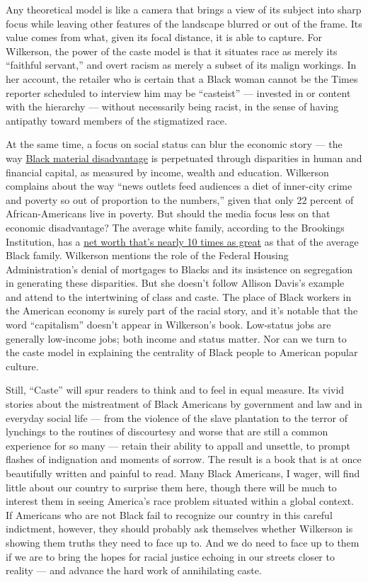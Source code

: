 Any theoretical model is like a camera that brings a view of its subject
into sharp focus while leaving other features of the landscape blurred
or out of the frame. Its value comes from what, given its focal
distance, it is able to capture. For Wilkerson, the power of the caste
model is that it situates race as merely its ``faithful servant,'' and
overt racism as merely a subset of its malign workings. In her account,
the retailer who is certain that a Black woman cannot be the Times
reporter scheduled to interview him may be ``casteist'' --- invested in
or content with the hierarchy --- without necessarily being racist, in
the sense of having antipathy toward members of the stigmatized race.

At the same time, a focus on social status can blur the economic story
--- the way
\href{https://www.nytimes3xbfgragh.onion/interactive/2019/08/14/magazine/racial-wealth-gap.html}{Black
material disadvantage} is perpetuated through disparities in human and
financial capital, as measured by income, wealth and education.
Wilkerson complains about the way ``news outlets feed audiences a diet
of inner-city crime and poverty so out of proportion to the numbers,''
given that only 22 percent of African-Americans live in poverty. But
should the media focus less on that economic disadvantage? The average
white family, according to the Brookings Institution, has a
\href{https://www.brookings.edu/blog/up-front/2020/02/27/examining-the-black-white-wealth-gap/}{net
worth that's nearly 10 times as great} as that of the average Black
family. Wilkerson mentions the role of the Federal Housing
Administration's denial of mortgages to Blacks and its insistence on
segregation in generating these disparities. But she doesn't follow
Allison Davis's example and attend to the intertwining of class and
caste. The place of Black workers in the American economy is surely part
of the racial story, and it's notable that the word ``capitalism''
doesn't appear in Wilkerson's book. Low-status jobs are generally
low-income jobs; both income and status matter. Nor can we turn to the
caste model in explaining the centrality of Black people to American
popular culture.

Still, ``Caste'' will spur readers to think and to feel in equal
measure. Its vivid stories about the mistreatment of Black Americans by
government and law and in everyday social life --- from the violence of
the slave plantation to the terror of lynchings to the routines of
discourtesy and worse that are still a common experience for so many ---
retain their ability to appall and unsettle, to prompt flashes of
indignation and moments of sorrow. The result is a book that is at once
beautifully written and painful to read. Many Black Americans, I wager,
will find little about our country to surprise them here, though there
will be much to interest them in seeing America's race problem situated
within a global context. If Americans who are not Black fail to
recognize our country in this careful indictment, however, they should
probably ask themselves whether Wilkerson is showing them truths they
need to face up to. And we do need to face up to them if we are to bring
the hopes for racial justice echoing in our streets closer to reality
--- and advance the hard work of annihilating caste.

